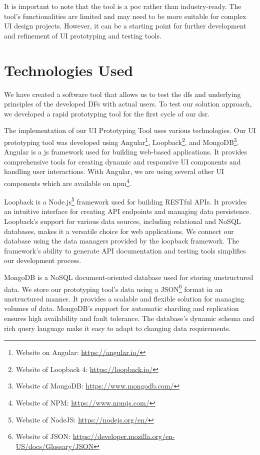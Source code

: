 It is important to note that the tool is a \ac{poc} rather than industry-ready. 
The tool's functionalities are limited and may need to be more suitable for complex UI design projects. 
However, it can be a starting point for further development and refinement of UI prototyping and testing tools.

\clearpage
\section{Technologies Used}
\label{implementation:section:technologies}
We have created a software tool that allows us to test the \ac{df}s and underlying principles of the developed DFs with actual users.
To test our solution approach, we developed a rapid prototyping tool for the first cycle of our \ac{dsr}. 

The implementation of our UI Prototyping Tool uses various technologies.
Our UI prototyping tool was developed using Angular\footnote{Website on Angular: \url{https://angular.io/}}, Loopback\footnote{Website of Loopback 4: \url{https://loopback.io/}}, and MongoDB\footnote{Website of MongoDB: \url{https://www.mongodb.com/}}.
Angular is a \ac{js} framework used for building web-based applications.
It provides comprehensive tools for creating dynamic and responsive UI components and handling user interactions.
With Angular, we are using several other UI components which are available on \ac{npm}\footnote{Website of NPM: \url{https://www.npmjs.com/}}.

Loopback is a Node.js\footnote{Website of NodeJS: \url{https://nodejs.org/en/}} framework used for building RESTful APIs. 
It provides an intuitive interface for creating API endpoints and managing data persistence. 
Loopback's support for various data sources, including relational and NoSQL databases, makes it a versatile choice for web applications. 
We connect our database using the data managers provided by the loopback framework.
The framework's ability to generate API documentation and testing tools simplifies our development process.

MongoDB is a NoSQL document-oriented database used for storing unstructured data. 
We store our prototyping tool's data using a JSON\footnote{Website of JSON: \url{https://developer.mozilla.org/en-US/docs/Glossary/JSON}} format in an unstructured manner.
It provides a scalable and flexible solution for managing volumes of data. 
MongoDB's support for automatic sharding and replication ensures high availability and fault tolerance. 
The database's dynamic schema and rich query language make it easy to adapt to changing data requirements.

